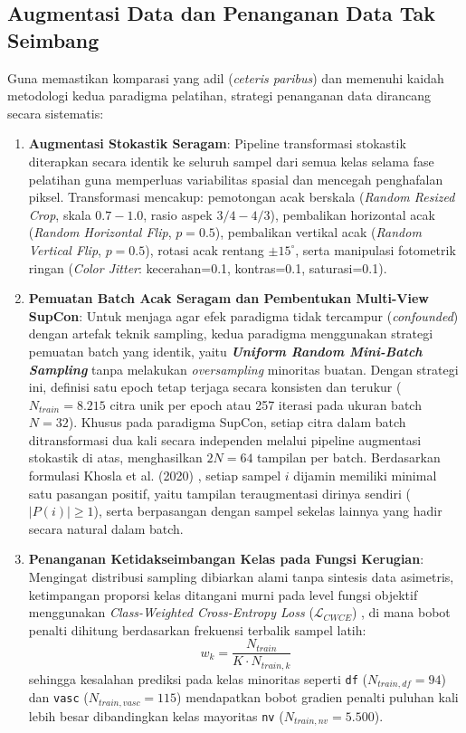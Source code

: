 \subsection{Augmentasi Data dan Penanganan Data Tak Seimbang} \label{III.Imbalanced}
Guna memastikan komparasi yang adil (\textit{ceteris paribus}) dan memenuhi kaidah metodologi kedua paradigma pelatihan, strategi penanganan data dirancang secara sistematis:
\begin{enumerate}[noitemsep]
	\item \textbf{Augmentasi Stokastik Seragam}: Pipeline transformasi stokastik diterapkan secara identik ke seluruh sampel dari semua kelas selama fase pelatihan guna memperluas variabilitas spasial dan mencegah penghafalan piksel. Transformasi mencakup: pemotongan acak berskala (\textit{Random Resized Crop}, skala $0.7 - 1.0$, rasio aspek $3/4 - 4/3$), pembalikan horizontal acak (\textit{Random Horizontal Flip}, $p=0.5$), pembalikan vertikal acak (\textit{Random Vertical Flip}, $p=0.5$), rotasi acak rentang $\pm 15^\circ$, serta manipulasi fotometrik ringan (\textit{Color Jitter}: kecerahan=0.1, kontras=0.1, saturasi=0.1).
	\item \textbf{Pemuatan Batch Acak Seragam dan Pembentukan Multi-View SupCon}: Untuk menjaga agar efek paradigma tidak tercampur (\textit{confounded}) dengan artefak teknik sampling, kedua paradigma menggunakan strategi pemuatan batch yang identik, yaitu \textbf{\textit{Uniform Random Mini-Batch Sampling}} tanpa melakukan \textit{oversampling} minoritas buatan. Dengan strategi ini, definisi satu epoch tetap terjaga secara konsisten dan terukur ($N_{train} = 8.215$ citra unik per epoch atau 257 iterasi pada ukuran batch $N=32$). Khusus pada paradigma SupCon, setiap citra dalam batch ditransformasi dua kali secara independen melalui pipeline augmentasi stokastik di atas, menghasilkan $2N = 64$ tampilan per batch. Berdasarkan formulasi Khosla et al. (2020) \cite{khosla2020supervised}, setiap sampel $i$ dijamin memiliki minimal satu pasangan positif, yaitu tampilan teraugmentasi dirinya sendiri ($|P(i)| \ge 1$), serta berpasangan dengan sampel sekelas lainnya yang hadir secara natural dalam batch.
	\item \textbf{Penanganan Ketidakseimbangan Kelas pada Fungsi Kerugian}: Mengingat distribusi sampling dibiarkan alami tanpa sintesis data asimetris, ketimpangan proporsi kelas ditangani murni pada level fungsi objektif menggunakan \textit{Class-Weighted Cross-Entropy Loss} ($\mathcal{L}_{CWCE}$) \cite{cui2019classbalanced, salmi2024imbalanced}, di mana bobot penalti dihitung berdasarkan frekuensi terbalik sampel latih:
	\begin{equation}
		w_k = \frac{N_{train}}{K \cdot N_{train, k}}
	\end{equation}
	sehingga kesalahan prediksi pada kelas minoritas seperti \texttt{df} ($N_{train, df}=94$) dan \texttt{vasc} ($N_{train, vasc}=115$) mendapatkan bobot gradien penalti puluhan kali lebih besar dibandingkan kelas mayoritas \texttt{nv} ($N_{train, nv}=5.500$).
\end{enumerate}

